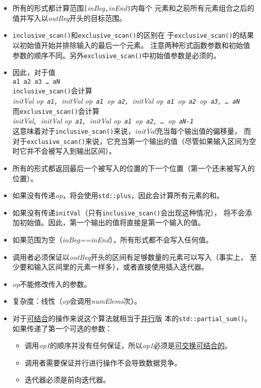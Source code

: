 \begin{itemize}
    \item 所有的形式都计算范围\texttt{[}\emph{inBeg}\texttt{,}\emph{inEnd}\texttt{)}内每个
    元素和之前所有元素组合之后的值并写入以\emph{outBeg}开头的目标范围。
    \item \texttt{inclusive\_scan()}和\texttt{exclusive\_scan()}的区别在
    于\texttt{exclusive\_scan()}的结果以初始值开始并排除输入的最后一个元素。
    注意两种形式函数参数和初始值参数的顺序不同。另外\texttt{exclusive\_scan()}中初始值参数是必须的。
    \item 因此，对于值\\
    \hspace*{2em}\texttt{a1 a2 a3 \ldots\ aN}\\
    \texttt{inclusive\_scan()}会计算\\
    \hspace*{2em}\emph{initVal op\texttt{ a1, }initVal op\texttt{ a1 }op\texttt{ a2, }initVal op\texttt{ a1 }op\texttt{ a2 }op\texttt{ a3, \ldots\ aN}}\\
    而\texttt{exclusive\_scan()}会计算\\
    \hspace*{2em}\emph{initVal\texttt{, }initVal op\texttt{ a1, }initVal op\texttt{ a1 }op\texttt{ a2, \ldots\ }op\texttt{ aN-1}}\\
    这意味着对于\texttt{inclusive\_scan()}来说，\emph{initVal}充当每个输出值的偏移量，
    而对于\texttt{exclusive\_scan()}来说，它充当第一个输出的值（尽管如果输入区间为空时它并不会被写入到输出区间）。
    \item 所有的形式都返回最后一个被写入的位置的下一个位置（第一个还未被写入的位置）。
    \item 如果没有传递\emph{op}，将会使用\texttt{std::plus}，因此会计算所有元素的和。
    \item 如果没有传递\texttt{initVal}（只有\texttt{inclusive\_scan()}会出现这种情况），
    将不会添加初始值。因此，第一个输出的值将直接是第一个输入的值。
    \item 如果范围为空（\emph{inBeg==inEnd}），所有形式都不会写入任何值。
    \item 调用者必须保证以\emph{outBeg}开头的区间有足够数量的元素可以写入（事实上，
    至少要和输入区间里的元素一样多），或者直接使用插入迭代器。
    \item \emph{op}不能修改传入的参数。
    \item 复杂度：线性（\emph{op}会调用\emph{numElems}次）。
    \item 对于\hyperref[ch22.6.1.1]{可结合}的操作来说这个算法就相当于\hyperref[ch22]{并行}版
    本的\texttt{std::partial\_sum()}。如果传递了第一个可选的参数：
    \begin{itemize}
        \item 调用\emph{op1}的顺序并没有任何保证，所以\emph{op1}必须是\hyperref[ch22.6.1.1]{可交换可结合的}。
        \item 调用者需要保证并行进行操作不会导致数据竞争。
        \item 迭代器必须是前向迭代器。
    \end{itemize}
\end{itemize}
